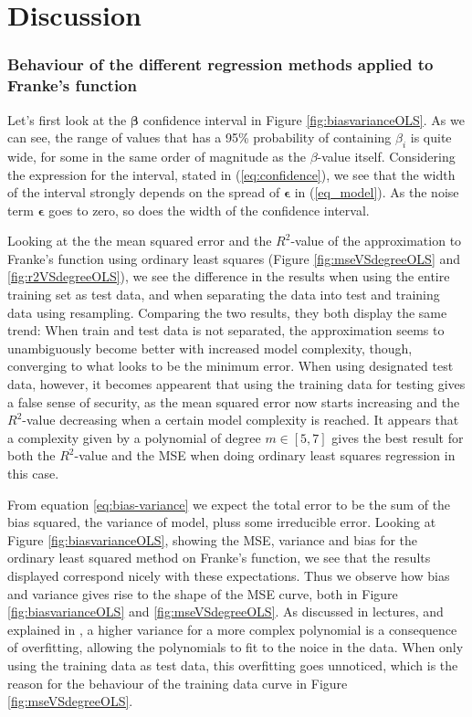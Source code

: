 \section{Discussion}
\label{sec:discussion}

\subsubsection*{Behaviour of the different regression methods applied to Franke's function}
Let's first look at the $\boldsymbol{\beta}$ confidence interval in Figure \ref{fig:biasvarianceOLS}. As we can see, the range of values that has a 95\% probability of containing $\beta_i$ is quite wide, for some in the same order of magnitude as the $\beta$-value itself. Considering the expression for the interval, stated in (\ref{eq:confidence}), we see that the width of the interval strongly depends on the spread of $\boldsymbol{\epsilon}$ in (\ref{eq_model}). As the noise term $\boldsymbol{\epsilon}$ goes to zero, so does the width of the confidence interval.

Looking at the  the mean squared error and the $R^2$-value of the approximation to Franke's function using ordinary least squares (Figure \ref{fig:mseVSdegreeOLS} and \ref{fig:r2VSdegreeOLS}), we see the difference in the results when using the entire training set as test data, and when separating the data into test and training data using resampling. Comparing the two results, they both display the same trend: When train and test data is not separated, the approximation seems to unambiguously become better with increased model complexity, though, converging to what looks to be the minimum error. When using designated test data, however, it becomes appearent that using the training data for testing gives a false sense of security, as the mean squared error now starts increasing and the $R^2$-value decreasing when a certain model complexity is reached. It appears that a complexity given by a polynomial of degree $m \in [5,7]$ gives the best result for both the $R^2$-value and the MSE when doing ordinary least squares regression in this case.

From equation \eqref{eq:bias-variance} we expect the total error to be the sum of the bias squared, the variance of model, pluss some irreducible error. Looking at Figure \ref{fig:biasvarianceOLS}, showing the MSE, variance and bias for the ordinary least squared method on Franke's function, we see that the results displayed correspond nicely with these expectations. Thus we observe how bias and variance gives rise to the shape of the MSE curve, both in Figure \ref{fig:biasvarianceOLS} and \ref{fig:mseVSdegreeOLS}. As discussed in lectures, and explained in \cite{hastie2009elements}, a higher variance for a more complex polynomial is a consequence of overfitting, allowing the polynomials to fit to the noice in the data. When only using the training data as test data, this overfitting goes unnoticed, which is the reason for the behaviour of the training data curve in Figure \ref{fig:mseVSdegreeOLS}.

